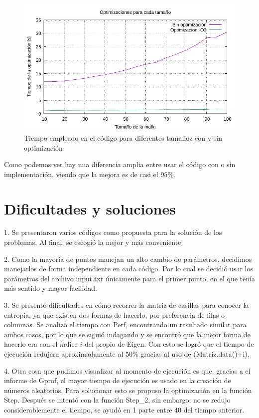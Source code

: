\documentclass{article}
\begin{document}
\begin{multicols}{2}
 \begin{figure}[H]
    \centering
    \includegraphics[width=\columnwidth]{optimizacion.pdf}
    \caption{Tiempo empleado en el código para diferentes tamañoz con y sin optimización}
    \label{optimizacion}
\end{figure}

Como podemos ver hay una diferencia amplia entre usar el código con o sin implementación, viendo que la mejora es de casi el $95\%$.
 
\section*{Dificultades y soluciones}

1. Se presentaron varios códigos como propuesta para la solución de los problemas, Al final, se escogió la mejor y más conveniente. 

2. Como la mayoría de puntos manejan un alto cambio de parámetros, decidimos manejarlos de forma independiente en cada código. Por lo cual se decidió usar los parámetros del archivo input.txt únicamente para el primer punto, en el que tenía más sentido y mayor facilidad.

3. Se presentó dificultades en cómo recorrer la matriz de casillas para conocer la entropía, ya que existen dos formas de hacerlo, por preferencia de filas o columnas. Se analizó el tiempo con Perf, encontrando un resultado similar para ambos casos, por lo que se siguió indagando y se encontró que la mejor forma de hacerlo era con el índice $i$ del propio de Eigen. Con esto se logró que el tiempo de ejecución redujera aproximadamente al $50\%$ gracias al uso de (Matriz.data()+i).

4. Otra cosa que pudimos visualizar al momento de ejecución es que, gracias a el informe de Gprof, el mayor tiempo de ejecución es usado en la creación de números aleatorios. Para solucionar esto se propuso la optimización en la función Step. Después se intentó con la función Step\_2, sin embargo, no se redujo considerablemente el tiempo, se ayudó en 1 parte entre 40 del tiempo anterior.


\end{multicols}
\end{document}
